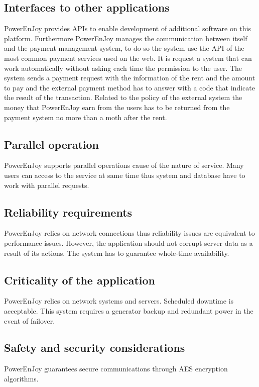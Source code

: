 \subsection{Interfaces to other applications}
PowerEnJoy provides APIs to enable development of additional software on this platform. Furthermore PowerEnJoy manages the communication between itself and the payment management system, to do so the system use the API of the most common payment services used on the web. It is request a system that can work automatically without asking each time the permission to the user. The system sends a payment request with the information of the rent and the amount to pay and the external payment method has to answer with a code that indicate the result of the transaction. Related to the policy of the external system the money that PowerEnJoy earn from the users has to be returned from the payment system no more than a moth after the rent.

\subsection{Parallel operation}
PowerEnJoy supports parallel operations cause of the nature of service. Many users can access to the service at same time thus system and database have to work with parallel requests.

\subsection{Reliability requirements}
PowerEnJoy relies on network connections thus reliability issues are equivalent to performance issues.  However, the application should not corrupt server data as a result of its actions. The system has to guarantee whole-time availability.

\subsection{Criticality of the application}
 PowerEnJoy relies on network systems and servers. Scheduled downtime is acceptable. This system requires a generator backup and redundant power in the event of failover.

\subsection{Safety and security considerations}
PowerEnJoy guarantees secure communications through AES encryption algorithms.
